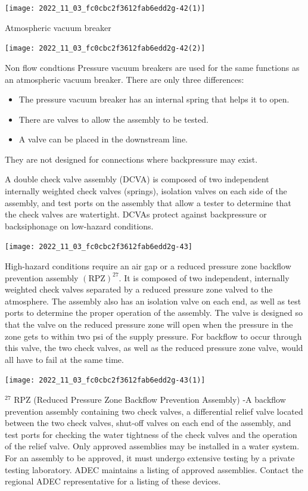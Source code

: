 \documentclass[10pt]{article}
\begin{document}
\texttt{[image: 2022\_11\_03\_fc0cbc2f3612fab6edd2g-42(1)]}

Atmospheric vacuum breaker

\texttt{[image: 2022\_11\_03\_fc0cbc2f3612fab6edd2g-42(2)]}

Non flow condtions Pressure vacuum breakers are used for the same functions as an atmospheric vacuum breaker. There are only three differences:

\begin{itemize}
  \item The pressure vacuum breaker has an internal spring that helps it to open.

  \item There are valves to allow the assembly to be tested.

  \item A valve can be placed in the downstream line.

\end{itemize}
They are not designed for connections where backpressure may exist.

A double check valve assembly (DCVA) is composed of two independent internally weighted check valves (springs), isolation valves on each side of the assembly, and test ports on the assembly that allow a tester to determine that the check valves are watertight. DCVAs protect against backpressure or backsiphonage on low-hazard conditions.

\texttt{[image: 2022\_11\_03\_fc0cbc2f3612fab6edd2g-43]}

High-hazard conditions require an air gap or a reduced pressure zone backflow prevention assembly $(\mathrm{RPZ})^{27}$. It is composed of two independent, internally weighted check valves separated by a reduced pressure zone valved to the atmosphere. The assembly also has an isolation valve on each end, as well as test ports to determine the proper operation of the assembly. The valve is designed so that the valve on the reduced pressure zone will open when the pressure in the zone gets to within two psi of the supply pressure. For backflow to occur through this valve, the two check valves, as well as the reduced pressure zone valve, would all have to fail at the same time.

\texttt{[image: 2022\_11\_03\_fc0cbc2f3612fab6edd2g-43(1)]}

${ }^{27}$ RPZ (Reduced Pressure Zone Backflow Prevention Assembly) -A backflow prevention assembly containing two check valves, a differential relief valve located between the two check valves, shut-off valves on each end of the assembly, and test ports for checking the water tightness of the check valves and the operation of the relief valve. Only approved assemblies may be installed in a water system. For an assembly to be approved, it must undergo extensive testing by a private testing laboratory. ADEC maintains a listing of approved assemblies. Contact the regional ADEC representative for a listing of these devices.
\end{document}
